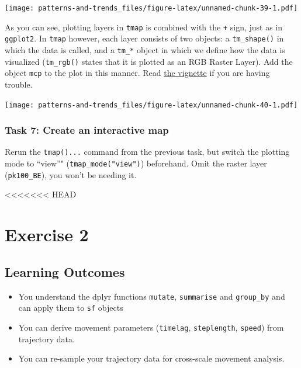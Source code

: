 \documentclass[]{book}
\providecommand{\tightlist}{%
  \setlength{\itemsep}{0pt}\setlength{\parskip}{0pt}}
\begin{document}
\texttt{[image: patterns-and-trends\_files/figure-latex/unnamed-chunk-39-1.pdf]}

As you can see, plotting layers in \texttt{tmap} is combined with the \texttt{+} sign, just as in \texttt{ggplot2}. In \texttt{tmap} however, each layer consists of two objects: a \texttt{tm\_shape()} in which the data is called, and a \texttt{tm\_*} object in which we define how the data is visualized (\texttt{tm\_rgb()} states that it is plotted as an RGB Raster Layer). Add the object \texttt{mcp} to the plot in this manner. Read \href{https://cran.r-project.org/web/packages/tmap/vignettes/tmap-getstarted.html}{the vignette} if you are having trouble.

\texttt{[image: patterns-and-trends\_files/figure-latex/unnamed-chunk-40-1.pdf]}

\hypertarget{task-7-create-an-interactive-map}{%
\subsection{Task 7: Create an interactive map}\label{task-7-create-an-interactive-map}}

Rerun the \texttt{tmap()...} command from the previous task, but switch the plotting mode to ``view''" (\texttt{tmap\_mode("view")}) beforehand. Omit the raster layer (\texttt{pk100\_BE}), you won't be needing it.

<<<<<<< HEAD
\hypertarget{exercise-2}{%
\chapter{Exercise 2}\label{exercise-2}}

\hypertarget{learning-outcomes}{%
\section{Learning Outcomes}\label{learning-outcomes}}

\begin{itemize}
\tightlist
\item
  You understand the dplyr functions \texttt{mutate}, \texttt{summarise} and \texttt{group\_by} and can apply them to \texttt{sf} objects
\item
  You can derive movement parameters (\texttt{timelag}, \texttt{steplength}, \texttt{speed}) from trajectory data.
\item
  You can re-sample your trajectory data for cross-scale movement analysis.
\end{itemize}
\end{document}
